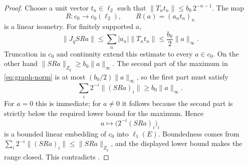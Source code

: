 \begin{proof}
Choose a unit vector \(t_n\in\ell_2\) such that
\(\|T_nt_n\|\le b_0\,2^{-n-1}\). The map
\[
 R:c_0\to c_0(\ell_2),\qquad R(a)=(a_nt_n)_n
\]
is a linear isometry. For finitely supported \(a\),
\[
 \|J_qSRa\|
 \le\sum_n |a_n|\|T_nt_n\|
 \le\frac{b_0}{2}\|a\|_\infty.
\]
Truncation in \(c_0\) and continuity extend this estimate to every
\(a\in c_0\). On the other hand
\(\|SRa\|_{Z_q}\ge b_0\|a\|_\infty\).
The second part of the maximum in \eqref{eq:graph-norm} is at most
\((b_0/2)\|a\|_\infty\), so the first part must satisfy
\[
 \sum_i2^{-i}\|(SRa)_i\|\ge b_0\|a\|_\infty.
\]
For \(a=0\) this is immediate; for \(a\ne0\) it follows because the
second part is strictly below the required lower bound for the
maximum. Hence
\[
 a\longmapsto \bigl(2^{-i}(SRa)_i\bigr)_i
\]
is a bounded linear embedding of \(c_0\) into \(\ell_1(E)\).
Boundedness comes from \(\sum_i2^{-i}\|(SRa)_i\|\le\|SRa\|_{Z_q}\),
and the displayed lower bound makes the range closed. This
contradicts .
\end{proof}
